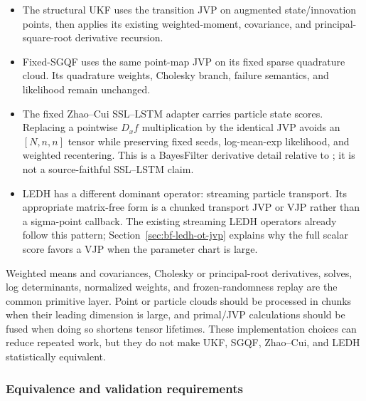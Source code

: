 \begin{itemize}
  \item The structural UKF uses the transition JVP on augmented
  state/innovation points, then applies its existing weighted-moment,
  covariance, and principal-square-root derivative recursion.
  \item Fixed-SGQF uses the same point-map JVP on its fixed sparse quadrature
  cloud.  Its quadrature weights, Cholesky branch, failure semantics, and
  likelihood remain unchanged.
  \item The fixed Zhao--Cui SSL--LSTM adapter carries particle state scores.
  Replacing a pointwise $D_xf$ multiplication by the identical JVP avoids an
  $[N,n,n]$ tensor while preserving fixed seeds, log-mean-exp likelihood, and
  weighted recentering.  This is a BayesFilter
   derivative detail relative to
  \citet{zhao2024ttsequential}; it is not a source-faithful SSL--LSTM claim.
  \item LEDH has a different dominant operator: streaming particle transport.
  Its appropriate matrix-free form is a chunked transport JVP or VJP rather
  than a sigma-point callback.  The existing streaming LEDH operators already
  follow this pattern; Section~\ref{sec:bf-ledh-ot-jvp} explains why the full
  scalar score favors a VJP when the parameter chart is large.
\end{itemize}

Weighted means and covariances, Cholesky or principal-root derivatives,
solves, log determinants, normalized weights, and frozen-randomness replay are
the common primitive layer.  Point or particle clouds should be processed in
chunks when their leading dimension is large, and primal/JVP calculations
should be fused when doing so shortens tensor lifetimes.  These implementation
choices can reduce repeated work, but they do not make UKF, SGQF, Zhao--Cui,
and LEDH statistically equivalent.

\subsubsection{Equivalence and validation requirements}

